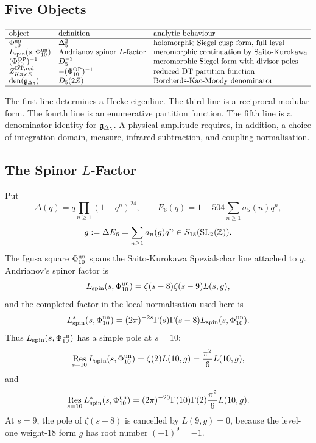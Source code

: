 \subsection*{Five Objects}

\[
\begin{array}{lll}
\hline
\text{object} & \text{definition} & \text{analytic behaviour}\\
\hline
\Phi_{10}^{\mathrm{un}} & \Delta_5^2
& \text{holomorphic Siegel cusp form, full level}\\
L_{\mathrm{spin}}(s,\Phi_{10}^{\mathrm{un}}) & \text{Andrianov spinor }L\text{-factor}
& \text{meromorphic continuation by Saito-Kurokawa}\\
(\Phi_{10}^{\mathrm{OP}})^{-1} & D_5^{-2}
& \text{meromorphic Siegel form with divisor poles}\\
Z_{K3\times E}^{\mathrm{DT},\mathrm{red}} & -(\Phi_{10}^{\mathrm{OP}})^{-1}
& \text{reduced DT partition function}\\
\operatorname{den}(\mathfrak{g}_{\Delta_5}) & D_5(2Z)
& \text{Borcherds-Kac-Moody denominator}\\
\hline
\end{array}
\]

The first line determines a Hecke eigenline.  The third line is a
reciprocal modular form.  The fourth line is an enumerative partition
function.  The fifth line is a denominator identity for
\(\mathfrak{g}_{\Delta_5}\).  A physical amplitude requires, in addition, a
choice of integration domain, measure, infrared subtraction, and
coupling normalisation.

\subsection*{The Spinor \(L\)-Factor}

Put
\[
        \Delta(q)=q\prod_{n\geq1}(1-q^n)^{24},\qquad
        E_6(q)=1-504\sum_{n\geq1}\sigma_5(n)q^n,
\]
\[
        g:=\Delta E_6=\sum_{n\geq1}a_n(g)q^n\in S_{18}(\mathrm{SL}_2(\mathbb{Z})).
\]
The Igusa square \(\Phi_{10}^{\mathrm{un}}\) spans the Saito-Kurokawa
Spezialschar line attached to \(g\).  Andrianov's spinor factor is
\[
        L_{\mathrm{spin}}(s,\Phi_{10}^{\mathrm{un}})
        =\zeta(s-8)\zeta(s-9)L(s,g),
\]
and the completed factor in the local normalisation used here is
\[
        L_{\mathrm{spin}}^{*}(s,\Phi_{10}^{\mathrm{un}})
        =(2\pi)^{-2s}\Gamma(s)\Gamma(s-8)
        L_{\mathrm{spin}}(s,\Phi_{10}^{\mathrm{un}}).
\]
Thus \(L_{\mathrm{spin}}(s,\Phi_{10}^{\mathrm{un}})\) has a simple pole at \(s=10\):
\[
        \operatorname*{Res}_{s=10}
        L_{\mathrm{spin}}(s,\Phi_{10}^{\mathrm{un}})
        =\zeta(2)L(10,g)
        =\frac{\pi^2}{6}L(10,g),
\]
and
\[
        \operatorname*{Res}_{s=10}
        L_{\mathrm{spin}}^{*}(s,\Phi_{10}^{\mathrm{un}})
        =(2\pi)^{-20}\Gamma(10)\Gamma(2)
        \frac{\pi^2}{6}L(10,g).
\]
At \(s=9\), the pole of \(\zeta(s-8)\) is cancelled by \(L(9,g)=0\),
because the level-one weight-\(18\) form \(g\) has root number
\((-1)^9=-1\).

